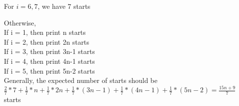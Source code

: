 \documentclass[12pt]{article}
\begin{document}
	For $i=6,7$, we have 7 starts
	
	Otherwise,\\
	If i = 1, then print n starts\\
	If i = 2, then print 2n starts\\
	If i = 3, then print 3n-1 starts\\
	If i = 4, then print 4n-1 starts\\
	If i = 5, then print 5n-2 starts\\
	
	Generally, the expected number of starts should be $\frac{2}{7} * 7 + \frac{1}{7} * n + \frac{1}{7} * 2n + \frac{1}{7} * (3n-1) +\frac{1}{7} * (4n - 1) + \frac{1}{7} * (5n-2)= \frac{15n + 9}{7}$ starts
\end{document}
